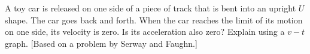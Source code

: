 A toy car is released on one side of a piece of track
that is bent into an upright $U$ shape. The car goes back
and forth. When the car reaches the limit of its motion on
one side, its velocity is zero. Is its acceleration also
zero? Explain using a $v-t$ graph. [Based on a problem
by Serway and Faughn.]
